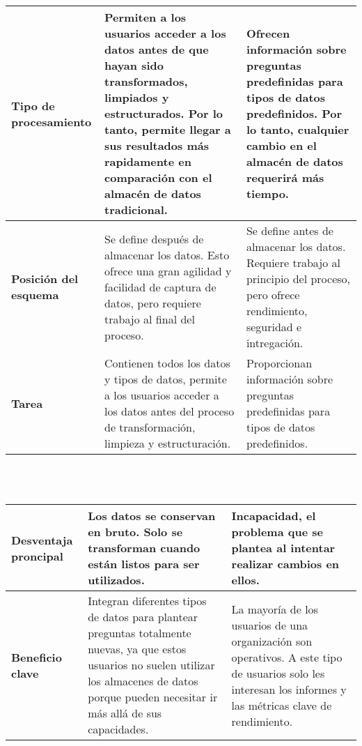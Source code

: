 \documentclass[11pt,twocolumn]{article}
\begin{document}
 \\\\
 \begin{tabular}{ | m{6em} | m{6.5em}| m{6.5em} | } 
 \hline
 
 \textbf{Tipo de procesamiento} & Permiten a los usuarios acceder a los datos antes de que hayan sido transformados, limpiados y estructurados. Por lo tanto, permite llegar a sus resultados m\'as rapidamente en comparaci\'on con el almac\'en de datos tradicional. & Ofrecen informaci\'on sobre preguntas predefinidas para tipos de datos predefinidos. Por lo tanto, cualquier cambio en el almac\'en de datos requerir\'a m\'as tiempo. \\
 \hline
 \textbf{Posici\'on del esquema} &  Se define despu\'es de almacenar los datos. Esto ofrece una gran agilidad y facilidad de captura de datos, pero requiere trabajo al final del proceso.& Se define antes de almacenar los datos. Requiere trabajo al principio del proceso, pero ofrece rendimiento, seguridad e intregaci\'on. \\
 
 \hline
 \textbf{Tarea} & Contienen todos los datos y tipos de datos, permite a los usuarios acceder a los datos antes del proceso de transformación, limpieza y estructuraci\'on. & Proporcionan informaci\'on sobre preguntas predefinidas para tipos de datos predefinidos. \\
   \hline
 \end{tabular}
 \\\\
 \begin{tabular}{ | m{5.5em} | m{6.5em}| m{6.5em} | } 
 \hline
 \textbf{Desventaja proncipal} & Los datos se conservan en bruto. Solo se transforman cuando est\'an listos para ser utilizados. & Incapacidad, el problema que se plantea al intentar realizar cambios en ellos. \\

 \hline
 \textbf{Beneficio clave} & Integran diferentes tipos de datos para plantear preguntas totalmente nuevas, ya que estos usuarios no suelen utilizar los almacenes de datos porque pueden necesitar ir m\'as all\'a de sus capacidades. & La mayor\'ia de los usuarios de una organizaci\'on son operativos. A este tipo de usuarios solo les interesan los informes y las m\'etricas clave de rendimiento. \\

\hline
\end{tabular}
\end{document}
